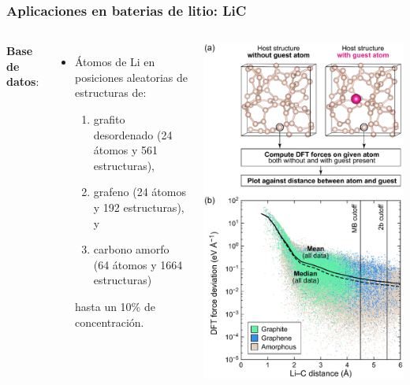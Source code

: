 \documentclass[aspectratio=169]{beamer}
\let\oldtextbf\textbf
\renewcommand{\textbf}[1]{\textcolor{nordblue}{\oldtextbf{#1}}}
\begin{document}
    \begin{frame}
        \frametitle{Aplicaciones en baterias de litio: LiC}
        
        \begin{columns}
            \textbf{Base de datos}:
            \begin{itemize}
                \item Átomos de Li en posiciones aleatorias de estructuras de:
                    \begin{enumerate}
                        \item grafito desordenado (24 átomos y 561 estructuras), 
                        \item grafeno (24 átomos y 192 estructuras), y
                        \item carbono amorfo (64 átomos y 1664 estructuras)
                    \end{enumerate}
                    hasta un 10\% de concentración.
            \end{itemize}

            \begin{center}
                \includegraphics[width=0.7\columnwidth]{LiC-fuerza_1_atomo_de_Li.png}
            \end{center}
        \end{columns}

    \end{frame}
    
\end{document}
